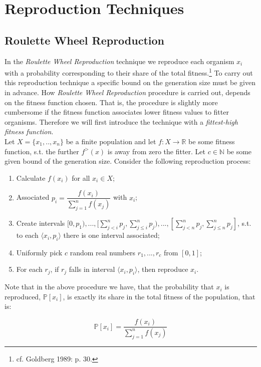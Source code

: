 \documentclass[a4paper]{article}
\newcommand{\lp}{\langle}
\newcommand{\rp}{\rangle}
\newcommand{\Prob}[1]{\mathbb{P}[#1]}
\theoremstyle{dotless}
\begin{document}
\section{Reproduction Techniques}

\subsection{Roulette Wheel Reproduction}

In the \textit{Roulette Wheel Reproduction} technique we reproduce each organism $x_i$ with a probability corresponding to their share of the total fitness.\footnote{cf. Goldberg 1989: p. 30.} To carry out this reproduction technique a specific bound on the generation size must be given in advance. How \emph{Roulette Wheel Reproduction} procedure is carried out, depends on the fitness function chosen. That is, the procedure is slightly more cumbersome if the fitness function associates lower fitness values to fitter organisms. Therefore we will first introduce the technique with a \emph{fittest-high fitness function}.\\

Let $X=\{x_1,..,x_n \}$ be a finite population and let $f: X \rightarrow \mathbb{R}$ be some fitness function, s.t. the further $f^>(x)$ is away from zero the fitter. Let $c \in \mathbb{N}$ be some given bound of the generation size. Consider the following reproduction process:

	\begin{enumerate}
	\item Calculate $f(x_i)$ for all $x_i \in X$;
	\item Associated $p_i = \dfrac{f(x_i)}{\sum^n_{j=1} f(x_j)}$ with $x_i$;
	\item  Create intervals $[0,p_1),...,[ \sum^n_{j<i} p_j, \sum^n_{j \leq i} p_j ),..., [\sum^n_{j<n} p_j, \sum^n_{j \leq n} p_j ]$, s.t. to each $\lp x_i,p_i \rp$ there is one interval associated;
	\item Uniformly pick $c$ random real numbers $r_1,...,r_c$ from $[0,1]$;
	\item For each $r_j$, if $r_j$ falls in interval $\lp x_i,p_i \rp$, then reproduce $x_i$.
	\end{enumerate}
	
Note that in the above procedure we have, that the probability that $x_i$ is reproduced, $\Prob{x_i}$, is exactly its share in the total fitness of the population, that is:

\begin{equation}
\Prob{x_i} = \dfrac{f(x_i)}{\sum^n_{j=1} f(x_j)}
\end{equation}
\end{document}

